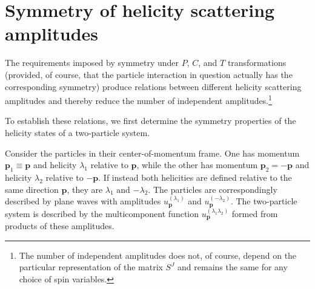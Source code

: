 \section{Symmetry of helicity scattering amplitudes}

The requirements imposed by symmetry under $P$, $C$, and $T$ transformations (provided, of course, that the particle interaction in question actually has the corresponding symmetry) produce relations between different helicity scattering amplitudes and thereby reduce the number of independent amplitudes.\footnote{The number of independent amplitudes does not, of course, depend on the particular representation of the matrix $S^J$ and remains the same for any choice of spin variables.}

To establish these relations, we first determine the symmetry properties of the helicity states of a two-particle system.

Consider the particles in their center-of-momentum frame. One has momentum $\mathbf p_1\equiv\mathbf p$ and helicity $\lambda_1$ relative to $\mathbf p$, while the other has momentum $\mathbf p_2=-\mathbf p$ and helicity $\lambda_2$ relative to $-\mathbf p$. If instead both helicities are defined relative to the same direction $\mathbf p$, they are $\lambda_1$ and $-\lambda_2$. The particles are correspondingly described by plane waves with amplitudes $u_{\mathbf p}^{(\lambda_1)}$ and $u_{\mathbf p}^{(-\lambda_2)}$. The two-particle system is described by the multicomponent function $u_{\mathbf p}^{(\lambda_1\lambda_2)}$ formed from products of these amplitudes.

